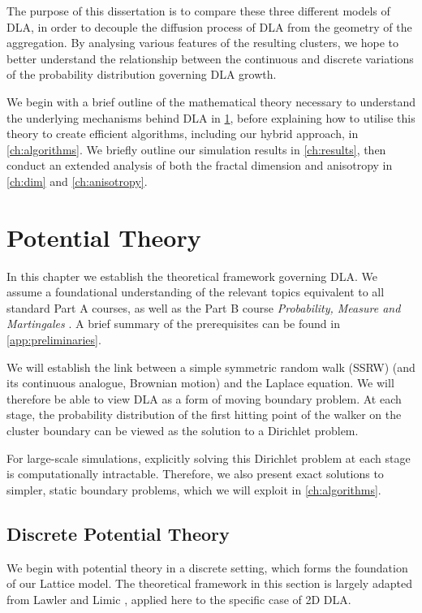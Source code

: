 \documentclass[12pt, a4paper, oneside]{report}
\theoremstyle{remark}
\begin{document}
The purpose of this dissertation is to compare these three different models of DLA, in order to decouple the diffusion process of DLA from the geometry of the aggregation. By analysing various features of the resulting clusters, we hope to better understand the relationship between the continuous and discrete variations of the probability distribution governing DLA growth.

We begin with a brief outline of the mathematical theory necessary to understand the underlying mechanisms behind DLA in \cref{ch:theory}, before explaining how to utilise this theory to create efficient algorithms, including our hybrid approach, in \cref{ch:algorithms}. We briefly outline our simulation results in \cref{ch:results}, then conduct an extended analysis of both the fractal dimension and anisotropy in \cref{ch:dim} and \cref{ch:anisotropy}.
\chapter{Potential Theory}
\label{ch:theory}

In this chapter we establish the theoretical framework governing DLA. We assume a foundational understanding of the relevant topics equivalent to all standard Part A courses, as well as the Part B course \textit{Probability, Measure and Martingales} \cite{oberhauser2025}. A brief summary of the prerequisites can be found in \cref{app:preliminaries}.

We will establish the link between a simple symmetric random walk (SSRW) (and its continuous analogue, Brownian motion) and the Laplace equation. We will therefore be able to view DLA as a form of moving boundary problem. At each stage, the probability distribution of the first hitting point of the walker on the cluster boundary can be viewed as the solution to a Dirichlet problem.

For large-scale simulations, explicitly solving this Dirichlet problem at each stage is computationally intractable. Therefore, we also present exact solutions to simpler, static boundary problems, which we will exploit in \cref{ch:algorithms}.

\section[Discrete Potential Theory]{Discrete Potential Theory}\label{sec:discrete_theory}
We begin with potential theory in a discrete setting, which forms the foundation of our Lattice model. The theoretical framework in this section is largely adapted from Lawler and Limic \cite{Lawler2010}, applied here to the specific case of 2D DLA.
\end{document}
